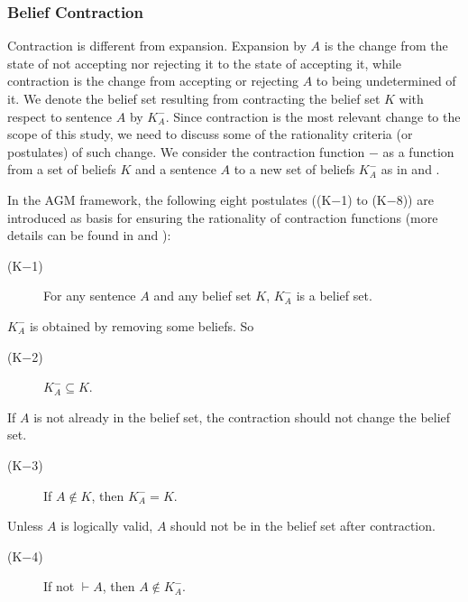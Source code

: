 \subsubsection{Belief Contraction}
Contraction is different from expansion. Expansion by $A$ is the change from the state of not accepting nor rejecting it to the state of accepting it, while contraction is the change from accepting or rejecting $A$ to being undetermined of it. We denote the belief set resulting from contracting the belief set $K$ with respect to sentence $A$ by $K^{-}_{A}$. Since contraction is the most relevant change to the scope of this study, we need to discuss some of the rationality criteria (or postulates) of such change. We consider the contraction function $-$ as a function from a set of beliefs $K$ and a sentence $A$ to a new set of beliefs $K^{-}_{A}$ as in \cite{flux} and \cite{kr}. 

In the AGM framework, the following eight postulates ((K$-$1) to (K$-$8)) are introduced as basis for ensuring the rationality of contraction functions (more details can be found in \cite{kr} and \cite{flux}):


\begin{description}
\item[(K$-$1)] For any sentence $A$ and any belief set $K$, $K^{-}_{A}$ is a belief set.
\end{description}
$K^{-}_{A}$ is obtained by removing some beliefs. So
\begin{description}
\item[(K$-$2)] $K^{-}_{A} \subseteq K$. 
\end{description}
If $A$ is not already in the belief set, the contraction should not change the belief set.
\begin{description}
\item[(K$-$3)] If $A \notin K$, then $K^{-}_{A} = K$. 
\end{description}
Unless $A$ is logically valid, $A$ should not be in the belief set after contraction.
\begin{description}
\item[(K$-$4)] If not $\vdash A$, then $A \notin K^{-}_{A}$. 
\end{description}


